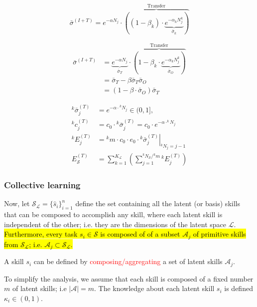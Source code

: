 \begin{equation}
    \bar{\sigma}^{(I+T)} = e^{-\alpha N_j}\cdot \overbrace{\left( (1- \beta_k) \cdot \underbrace{e^{-\alpha_k N^k_j}}_{\bar{\sigma}_k}\right) }^{\text{Transfer}}
\end{equation}

\begin{align}
    \bar{\sigma}^{(I+T)} &= \underbrace{e^{-\alpha N_j}}_{\bar{\sigma}_T}\cdot \overbrace{\left( 1- \beta_k \cdot \underbrace{e^{-\alpha_k N^k_j}}_{\bar{\sigma}_O}\right) }^{\text{Transfer}}\\
    &= \bar{\sigma}_T - \beta \bar{\sigma}_T \bar{\sigma}_O\\
    &= (1 - \beta \cdot \bar{\sigma}_O) \bar{\sigma}_T
\end{align}



\begin{subequations}\label{eq:cl_total_energy}
\begin{align}
{^k}\bar{\sigma}^{(T)}_j &= e^{-\alpha  \cdot {^k}N_{j}} \in (0,1],\\
{^k}c^{(T)}_j &= c_0 \cdot {^k}\bar{\sigma}^{(T)}_j = c_0 \cdot e^{-\alpha \cdot ^kN_{j}}\\\label{eq:complexity_TL}
  {^k}E^{(T)}_j &= {^km} \cdot c_0 \cdot e_0 \cdot \left.{^k}\bar{\sigma}^{(T)}_j \right\vert_{{^k}N_j = j-1}\\
  E^{(T)}_{\mathcal{S}} &= \sum^{K_\mathcal{L}}_{k=1}  \left( {\sum^{{{^k}N_{\mathcal{S}}}/{{^k}m}}_{j=1} {^k}E^{(T)}_j} \right)
\end{align}
\end{subequations}

\subsubsection{Collective learning}
Now, let $\mathcal{S}_\mathcal{L} = \lbrace \hat{s}_i\rbrace^n_{i=1}$ define the set containing all the latent (or basis) skills that can be composed to accomplish any skill, where each latent skill is independent of the other; i.e. they are the dimensions of the latent space $\mathcal{L}$. \hl{Furthermore, every task $s_i \in \mathcal{S}$ is composed of of a subset $\mathcal{A}_j$ of primitive skills from $\mathcal{S}_\mathcal{L}$; i.e. $ \mathcal{A}_j \subset \mathcal{S}_\mathcal{L} $. }
\begin{tcolorbox}
	\begin{definition}\label{definition:complexity} A skill $s_i$ can be defined by \textcolor{red}{composing/aggregating} a set of latent skills $\mathcal{A}_j$.
	\end{definition}
\end{tcolorbox}
To simplify the analysis, we assume that each skill is composed of a fixed number $m$ of latent skills; i.e $|\mathcal{A}| = m$. The knowledge about each latent skill $s_i$ is defined $ \kappa_i \in (0,1) $.

